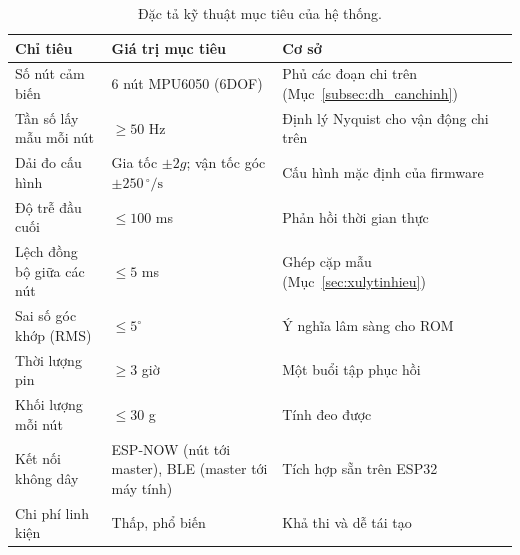 \documentclass[../DoAn.tex]{subfiles}
\begin{document}
\begin{table}[h]
    \centering
    \caption{Đặc tả kỹ thuật mục tiêu của hệ thống.}
    \label{tab:dacta}
    \begin{tabular}{p{4.2cm} p{4.5cm} p{4.8cm}}
        \hline
        \textbf{Chỉ tiêu}         & \textbf{Giá trị mục tiêu}                                  & \textbf{Cơ sở}                                       \\
        \hline
        Số nút cảm biến           & 6 nút MPU6050 (6DOF)                                       & Phủ các đoạn chi trên (Mục~\ref{subsec:dh_canchinh}) \\
        Tần số lấy mẫu mỗi nút    & $\ge 50$ Hz                                                & Định lý Nyquist cho vận động chi trên                \\
        Dải đo cấu hình           & Gia tốc $\pm 2g$; vận tốc góc $\pm 250\,^{\circ}/\text{s}$ & Cấu hình mặc định của firmware                       \\
        Độ trễ đầu cuối           & $\le 100$ ms                                               & Phản hồi thời gian thực                              \\
        Lệch đồng bộ giữa các nút & $\le 5$ ms                                                 & Ghép cặp mẫu (Mục~\ref{sec:xulytinhieu})             \\
        Sai số góc khớp (RMS)     & $\le 5^{\circ}$                                            & Ý nghĩa lâm sàng cho ROM                             \\
        Thời lượng pin            & $\ge 3$ giờ                                                & Một buổi tập phục hồi                                \\
        Khối lượng mỗi nút        & $\le 30$ g                                                 & Tính đeo được                                        \\
        Kết nối không dây         & ESP-NOW (nút tới master), BLE (master tới máy tính)        & Tích hợp sẵn trên ESP32                              \\
        Chi phí linh kiện         & Thấp, phổ biến                                             & Khả thi và dễ tái tạo                                \\
        \hline
    \end{tabular}
\end{table}
\end{document}
